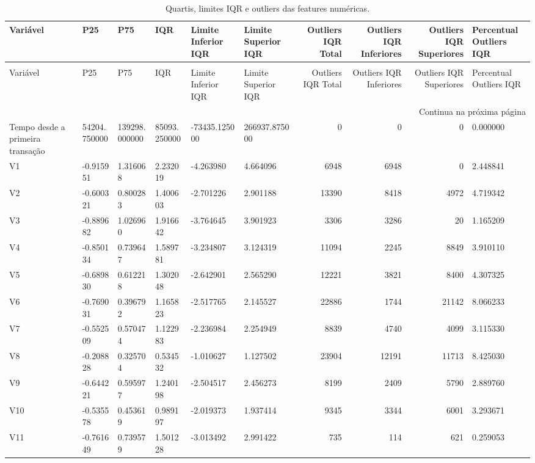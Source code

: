 \begin{longtable}{llllllrrrl}
\caption{Quartis, limites IQR e outliers das features numéricas.} \label{tab:iqr-outliers-features} \\
\toprule
Variável & P25 & P75 & IQR & Limite Inferior IQR & Limite Superior IQR & Outliers IQR Total & Outliers IQR Inferiores & Outliers IQR Superiores & Percentual Outliers IQR \\
\midrule
\endfirsthead
\caption[]{Quartis, limites IQR e outliers das features numéricas.} \\
\toprule
Variável & P25 & P75 & IQR & Limite Inferior IQR & Limite Superior IQR & Outliers IQR Total & Outliers IQR Inferiores & Outliers IQR Superiores & Percentual Outliers IQR \\
\midrule
\endhead
\midrule
\multicolumn{10}{r}{Continua na próxima página} \\
\midrule
\endfoot
\bottomrule
\endlastfoot
Tempo desde a primeira transação & 54204.750000 & 139298.000000 & 85093.250000 & -73435.125000 & 266937.875000 & 0 & 0 & 0 & 0.000000 \\
V1 & -0.915951 & 1.316068 & 2.232019 & -4.263980 & 4.664096 & 6948 & 6948 & 0 & 2.448841 \\
V2 & -0.600321 & 0.800283 & 1.400603 & -2.701226 & 2.901188 & 13390 & 8418 & 4972 & 4.719342 \\
V3 & -0.889682 & 1.026960 & 1.916642 & -3.764645 & 3.901923 & 3306 & 3286 & 20 & 1.165209 \\
V4 & -0.850134 & 0.739647 & 1.589781 & -3.234807 & 3.124319 & 11094 & 2245 & 8849 & 3.910110 \\
V5 & -0.689830 & 0.612218 & 1.302048 & -2.642901 & 2.565290 & 12221 & 3821 & 8400 & 4.307325 \\
V6 & -0.769031 & 0.396792 & 1.165823 & -2.517765 & 2.145527 & 22886 & 1744 & 21142 & 8.066233 \\
V7 & -0.552509 & 0.570474 & 1.122983 & -2.236984 & 2.254949 & 8839 & 4740 & 4099 & 3.115330 \\
V8 & -0.208828 & 0.325704 & 0.534532 & -1.010627 & 1.127502 & 23904 & 12191 & 11713 & 8.425030 \\
V9 & -0.644221 & 0.595977 & 1.240198 & -2.504517 & 2.456273 & 8199 & 2409 & 5790 & 2.889760 \\
V10 & -0.535578 & 0.453619 & 0.989197 & -2.019373 & 1.937414 & 9345 & 3344 & 6001 & 3.293671 \\
V11 & -0.761649 & 0.739579 & 1.501228 & -3.013492 & 2.991422 & 735 & 114 & 621 & 0.259053 \\

\end{longtable}
